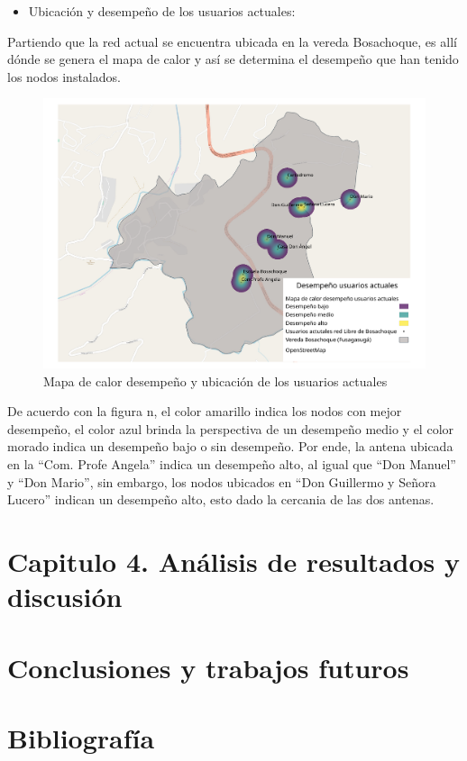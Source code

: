 \documentclass[]{article}
\providecommand{\tightlist}{%
  \setlength{\itemsep}{0pt}\setlength{\parskip}{0pt}}
\begin{document}
\begin{itemize}
\tightlist
\item
  Ubicación y desempeño de los usuarios actuales:
\end{itemize}

Partiendo que la red actual se encuentra ubicada en la vereda
Bosachoque, es allí dónde se genera el mapa de calor y así se determina
el desempeño que han tenido los nodos instalados.

\begin{figure}
\centering
\includegraphics{Desempeno_usuarios_actuales_bosachoque.pdf}
\caption{Mapa de calor desempeño y ubicación de los usuarios actuales}
\end{figure}

De acuerdo con la figura n, el color amarillo indica los nodos con mejor
desempeño, el color azul brinda la perspectiva de un desempeño medio y
el color morado indica un desempeño bajo o sin desempeño. Por ende, la
antena ubicada en la ``Com. Profe Angela'' indica un desempeño alto, al
igual que ``Don Manuel'' y ``Don Mario'', sin embargo, los nodos
ubicados en ``Don Guillermo y Señora Lucero'' indican un desempeño alto,
esto dado la cercania de las dos antenas.

\section{Capitulo 4. Análisis de resultados y
discusión}\label{capitulo-4.-anuxe1lisis-de-resultados-y-discusiuxf3n}

\section{Conclusiones y trabajos
futuros}\label{conclusiones-y-trabajos-futuros}

\section{Bibliografía}\label{bibliografuxeda}
\end{document}
